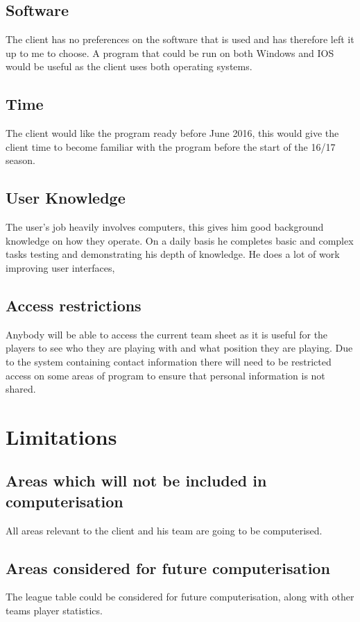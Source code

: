 \subsection{Software}
The client has no preferences on the software that is used and has therefore left it up to me to choose. A program that could be run on both Windows and IOS would be useful as the client uses both operating systems.  
\subsection{Time}
The client would like the program ready before June 2016, this would give the client time to become familiar with the program before the start of the 16/17 season. 
\subsection{User Knowledge}
The user's job heavily involves computers, this gives him good background knowledge on how they operate. On a daily basis he completes basic and complex tasks testing and  demonstrating his depth of knowledge. He does a lot of work improving user interfaces, 
\subsection{Access restrictions}
Anybody will be able to access the current team sheet as it is useful for the players to see who they are playing with and what position they are playing. Due to the system containing contact information there will need to be restricted access on some areas of program to ensure that personal information is not shared.   

\section{Limitations}

\subsection{Areas which will not be included in computerisation}
All areas relevant to the client and his team are going to be computerised.
\subsection{Areas considered for future computerisation}
The league table could be considered for future computerisation, along with other teams player statistics.
